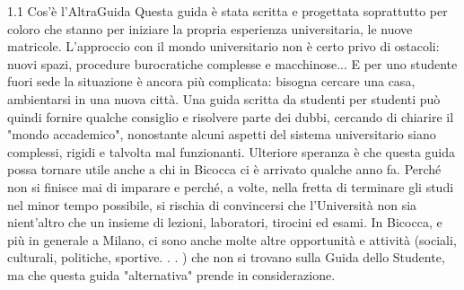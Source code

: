 1.1 Cos’è l’AltraGuida
Questa guida è stata scritta e progettata soprattutto per coloro che stanno per iniziare la propria esperienza universitaria, le nuove matricole. L'approccio con il mondo universitario non è certo privo di ostacoli: nuovi spazi, procedure burocratiche complesse e macchinose... E per uno studente fuori sede la situazione è ancora più complicata: bisogna cercare una casa, ambientarsi in una nuova città. Una guida scritta da studenti per studenti può quindi fornire qualche consiglio e risolvere parte dei dubbi, cercando di chiarire il "mondo accademico", nonostante alcuni aspetti del sistema universitario siano complessi, rigidi e talvolta mal funzionanti.
Ulteriore speranza è che questa guida possa tornare utile anche a chi in Bicocca ci è arrivato qualche anno fa. Perché non si finisce mai di imparare e perché, a volte, nella fretta di terminare gli studi nel minor tempo possibile, si rischia di convincersi che l'Università non sia nient'altro che un insieme di lezioni, laboratori, tirocini ed esami. In Bicocca, e più in generale a Milano, ci sono anche molte altre opportunità e attività (sociali, culturali, politiche, sportive. . . ) che non si trovano sulla Guida dello Studente, ma che questa guida "alternativa" prende in considerazione.

